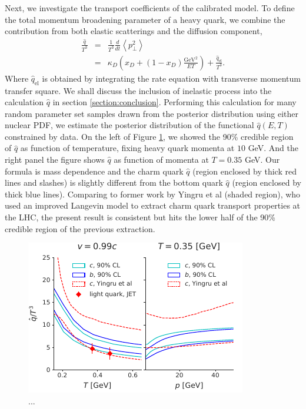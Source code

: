 \documentclass[aps, prc, reprint, amsmath, groupedaddress, nofootinbib]{revtex4-1}
\begin{document}
Next, we investigate the transport coefficients of the calibrated model.
To define the total momentum broadening parameter of a heavy quark,
we combine the contribution from both elastic scatterings and the diffusion component,
\begin{eqnarray}\label{eq:qhat}
\frac{\hat{q}}{T^3} &=& \frac{1}{T^3}\frac{d}{dt}\left\langle p_\perp^2 \right\rangle\\
\nonumber
 &=&  \kappa_D\left(x_D + (1-x_D)\frac{\textrm{GeV}^2}{ET}\right) + \frac{\hat{q}_{\textrm{el}}}{T^3}.
\end{eqnarray}
Where $\hat{q}_{\textrm{el}}$ is obtained by integrating the rate equation with transverse momentum transfer square.
We shall discuss the inclusion of inelastic process into the calculation $\hat{q}$ in section \ref{section:conclusion}.
Performing this calculation for many random parameter set samples drawn from the posterior distribution using either nuclear PDF, we estimate the posterior distribution of the functional $\hat{q}(E, T)$ constrained by data.
On the left of Figure \ref{plots:posterior_qhat}, we showed the 90\% credible region of $\hat{q}$ as function of temperature, fixing heavy quark momenta at $10$ GeV.
And the right panel the figure shows $\hat{q}$ as function of momenta at $T=0.35$ GeV.
Our formula is mass dependence and the charm quark $\hat{q}$ (region enclosed by thick red lines and slashes) is slightly different from the bottom quark $\hat{q}$ (region enclosed by thick blue lines).
Comparing to former work by Yingru et al (shaded region), who used an improved Langevin model to extract charm quark transport properties at the LHC, the present result is consistent but hits the lower half of the 90\% credible region of the previous extraction.
\begin{figure}
\includegraphics[width=\columnwidth]{qhat_p_T.pdf}
\caption{...}\label{plots:posterior_qhat}
\end{figure}
\end{document}
